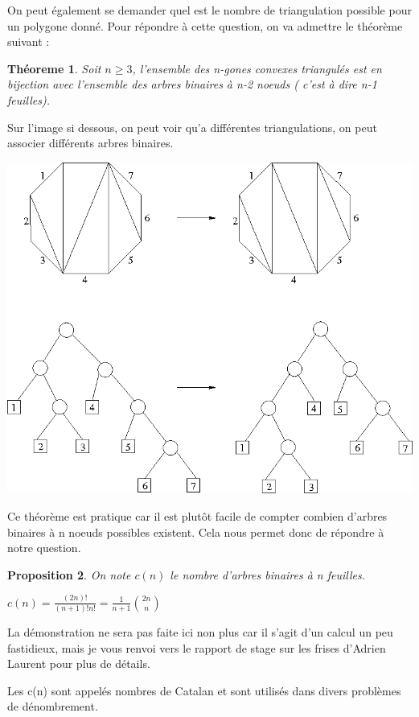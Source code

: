 \documentclass[a4paper]{article}
\theoremstyle{plain}
\newtheorem{thm}{Théoreme}[section]
\newtheorem{prop}[thm]{Proposition}
\theoremstyle{definition}
\theoremstyle{proof}
\theoremstyle{remark}
\begin{document}
On peut également se demander quel est le nombre de triangulation possible pour un polygone donné.
Pour répondre à cette question, on va admettre le théorème suivant :

\begin{thm}
Soit $n\ge 3$, l'ensemble des n-gones convexes triangulés est en bijection avec l'ensemble des arbres binaires à n-2 noeuds ( c'est à dire n-1 feuilles).
\end{thm}

Sur l'image si dessous, on peut voir qu'a différentes triangulations, on peut associer différents arbres binaires.
\begin{center}
\includegraphics[scale=0.5]{triang-bina.png}
\end{center}

Ce théorème est pratique car il est plutôt facile de compter combien d'arbres binaires à n noeuds possibles existent. Cela nous permet donc de répondre à notre question.

\begin{prop} 
On note $c(n)$ le nombre d'arbres binaires à n feuilles.

$c(n)=\frac{(2n)!}{(n+1)!n!}=\frac{1}{n+1}\binom{2n}{n}$
\end{prop}
La démonstration ne sera pas faite ici non plus car il s'agit d'un calcul un peu fastidieux, mais je vous renvoi vers le rapport de stage sur les frises d'Adrien Laurent pour plus de détails.

Les c(n) sont appelés nombres de Catalan et sont utilisés dans divers problèmes de dénombrement.
\end{document}
